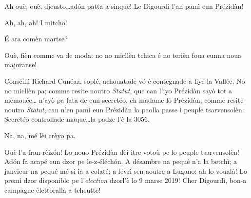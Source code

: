 \begin{drama}
\Secreteospeaks  {} Ah ouè, ouè, djeusto\ldots ad\'on patta a sinque! Le Digourdì l’an pamì eun Prézidàn!

\Cimaspeaks Ah, ah, ah! I mitcho!

\Eyviaspeaks \'E ara comèn martse?

\Richardspeaks Ouè, fièn comme va de moda: no no micllèn tchica é no terièn foua eunna noua majoranse!

\Jordyspeaks Conséillì Richard Cunéaz, soplé, achouatade-v\'o é contegnade a liye la Vallée. No no micllèn pa; comme resite noutro \textit{Statut}, que can l'iyo Prézidàn sayò tot a mémouée\ldots {} n'ayò pa fata de eun secretéo, eh madame lo Prézidàn; comme resite noutro \textit{Statut}, can n'en pamì eun Prézidàn la paolla passe i peuple tsarvensolèn. Secretéo controllade maque\ldots la padze l'è la 3056.

\Secreteospeaks Na, na, mé lèi crèyo pa.


\Secreteospeaks Ouè l'a fran rèiz\'on! Lo nouo Prézidàn dèi itre votoù pe lo peuple tsarvensolèn! Ad\'on fa acapé eun dzor pe le-z-éléch\'on.  A désambre na pequé n'a la betchì; a janvieur na pequé mé si ià a colaté; a févrì sen aoutre a Lugano; ah lo voualà! Lo premì dzor disponiblo pe \og l’\textit{election} dzor\fg l’è lo 9 marse 2019! Cher Digourdì, bon-a campagne élettoralla a tcheutte!






\end{drama}
